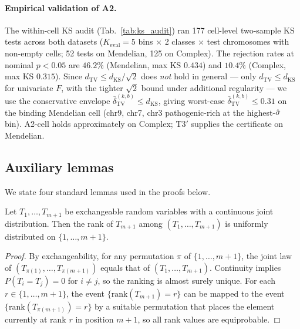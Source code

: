 \paragraph{Empirical validation of A2.}
The within-cell KS audit (Tab.~\ref{tab:ks_audit}) ran 177 cell-level two-sample KS tests across both datasets ($K_{\mathrm{eval}} = 5$ bins $\times$ 2 classes $\times$ test chromosomes with non-empty cells; 52 tests on Mendelian, 125 on Complex). The rejection rates at nominal $p < 0.05$ are $46.2\%$ (Mendelian, max KS $0.434$) and $10.4\%$ (Complex, max KS $0.315$). Since $d_{\mathrm{TV}} \leq d_{\mathrm{KS}} / \sqrt{2}$ does \emph{not} hold in general — only $d_{\mathrm{TV}} \leq d_{\mathrm{KS}}$ for univariate $F$, with the tighter $\sqrt{2}$ bound under additional regularity — we use the conservative envelope $\bar\delta_{\mathrm{TV}}^{(k,b)} \leq d_{\mathrm{KS}}$, giving worst-case $\bar\delta_{\mathrm{TV}}^{(k,b)} \leq 0.31$ on the binding Mendelian cell (chr9, chr7, chr3 pathogenic-rich at the highest-$\hat{\sigma}$ bin). A2-cell holds approximately on Complex; T3$'$ supplies the certificate on Mendelian.


\subsection{Auxiliary lemmas}
\label{app:proofs:lemmas}

We state four standard lemmas used in the proofs below.

\begin{lemma}
\label{lem:rank}
Let $T_1, \ldots, T_{m+1}$ be exchangeable random variables with a continuous joint distribution. Then the rank of $T_{m+1}$ among $(T_1, \ldots, T_{m+1})$ is uniformly distributed on $\{1, \ldots, m+1\}$.
\end{lemma}

\begin{proof}
By exchangeability, for any permutation $\pi$ of $\{1, \ldots, m+1\}$, the joint law of $(T_{\pi(1)}, \ldots, T_{\pi(m+1)})$ equals that of $(T_1, \ldots, T_{m+1})$. Continuity implies $P(T_i = T_j) = 0$ for $i \neq j$, so the ranking is almost surely unique. For each $r \in \{1, \ldots, m+1\}$, the event $\{\mathrm{rank}(T_{m+1}) = r\}$ can be mapped to the event $\{\mathrm{rank}(T_{\pi(m+1)}) = r\}$ by a suitable permutation that places the element currently at rank $r$ in position $m+1$, so all rank values are equiprobable.
\end{proof}


